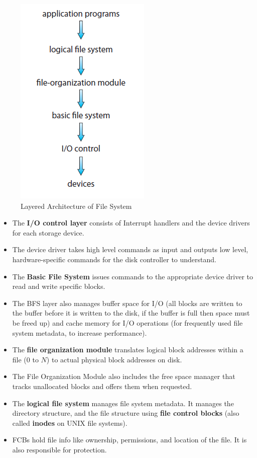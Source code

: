 \documentclass{article}
\theoremstyle{plain}
\theoremstyle{definition}
\begin{document}
\begin{figure}[!h]
    \centering
    \includegraphics[scale=0.7]{os6.png}
    \caption{Layered Architecture of File System}
    \label{fig:my_label_17}
\end{figure}
\begin{itemize}
    \item The \textbf{I/O control layer} consists of Interrupt handlers and the device drivers for each storage device. 
    
    \item The device driver takes high level commands as input and outputs low level, hardware-specific commands for the disk controller to understand. 
    
    \item The \textbf{Basic File System} issues commands to the appropriate device driver to read and write specific blocks. 
    
    \item The BFS layer also manages buffer space for I/O (all blocks are written to the buffer before it is written to the disk, if the buffer is full then space must be freed up) and cache memory for I/O operations (for frequently used file system metadata, to increase performance).
    
    \item The \textbf{file organization module} translates logical block addresses within a file (0 to $N$) to actual physical block addresses on disk. 
    
    \item The File Organization Module also includes the free space manager that tracks unallocated blocks and offers them when requested.
    
    \item The \textbf{logical file system} manages file system metadata. It manages the directory structure, and the file structure using \textbf{file control blocks} (also called \textbf{inodes} on UNIX file systems). 
    
    \item FCBs hold file info like ownership, permissions, and location of the file. It is also responsible for protection. 
\end{itemize}
\end{document}
